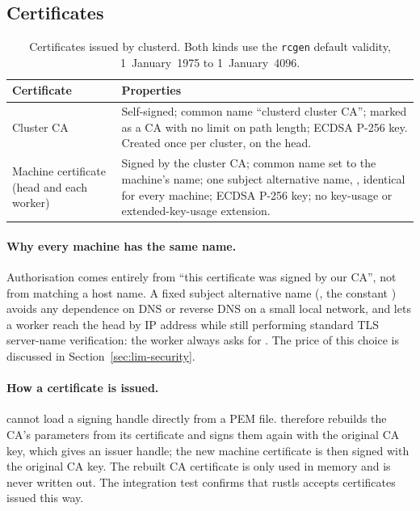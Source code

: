 \documentclass{article}
\begin{document}
\subsection{Certificates}

\begin{table}[htbp]
  \centering
  \begin{tabular}{L{0.2\textwidth}L{0.68\textwidth}}
    \hline
    Certificate & Properties \\
    \hline
    Cluster CA
      & Self-signed; common name ``clusterd cluster CA''; marked as a CA
        with no limit on path length; ECDSA P-256 key. Created once per
        cluster, on the head. \\
    Machine certificate (head and each worker)
      & Signed by the cluster CA; common name set to the machine's name;
        one subject alternative name, , identical
        for every machine; ECDSA P-256 key; no key-usage or
        extended-key-usage extension. \\
    \hline
  \end{tabular}
  \caption{Certificates issued by clusterd. Both kinds use the
    \texttt{rcgen} default validity, 1~January~1975 to 1~January~4096.}
  \label{tab:certs}
\end{table}

\paragraph{Why every machine has the same name.}
Authorisation comes entirely from ``this certificate was signed by our
CA'', not from matching a host name. A fixed subject alternative name
(, the constant ) avoids any
dependence on DNS or reverse DNS on a small local network, and lets a
worker reach the head by IP address while still performing standard TLS
server-name verification: the worker always asks for .
The price of this choice is discussed in
Section~\ref{sec:lim-security}.

\paragraph{How a certificate is issued.}
 cannot load a signing handle directly from a PEM file.
 therefore rebuilds the CA's parameters from its
certificate and signs them again with the original CA key, which gives an
issuer handle; the new machine certificate is then signed with the
original CA key. The rebuilt CA certificate is only used in memory and is
never written out. The integration test confirms that rustls accepts
certificates issued this way.
\end{document}
